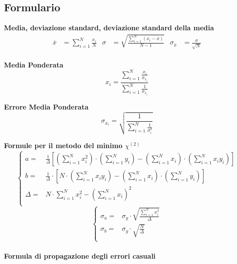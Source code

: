 \documentclass[a4paper,11pt,oneside]{article}
\begin{document}
\subsection{Formulario}
\textbf{Media, deviazione standard, deviazione standard della media}
\begin{align*}
        \overline{x}&=\sum\limits_{i=1}^{N} \frac{x_{i}}{N}&
        \sigma&=\sqrt{\frac{\sum\limits_{i=1}^{N} (x_{i}-\overline{x})}{N-1}}&
        \sigma_{\overline{x}}&=\frac{\sigma}{\sqrt{N}}
\end{align*}\\

\textbf{Media Ponderata}
\begin{equation*}
\label{eq:media_pond}
    x_i=\frac{\sum_{i=1}^{N}\frac{x_i}{\sigma_{x_i}}}{\sum_{i=1}^{N}\frac{1}{\sigma_{x_i}}}
\end{equation*}

\textbf{Errore Media Ponderata}
\begin{equation*}
\label{eq:errore_media_pond}
     \sigma_{x_i}=\sqrt{\frac{1}{\sum_{i=1}^{N}\frac{1}{\sigma_{i}^{2}}}}
\end{equation*}

\textbf{Formule per il metodo del minimo ${\chi}^{(2)}$}
\begin{equation*}
        \begin{cases}
    a=&\frac{1}{\Delta}[(\sum\limits_{i=1}^{N}{x_{i}^{2}})\cdot(\sum\limits_{i=1}^{N}{y_{i}})-(\sum\limits_{i=1}^{N}{x_{i}})\cdot(\sum\limits_{i=1}^{N}{x_{i}y_{i}})] \\ 
    b=&\frac{1}{\Delta }\cdot \left [N\cdot \left ( \sum\limits_{i=1}^{N}x_i y_i \right )-\left ( \sum\limits_{i=1}^{N}x_i \right )\cdot \left ( \sum\limits_{i=1}^{N}y_i \right )  \right ]\\
    \Delta=& N\cdot \sum\limits_{i=1}^{N} x_i^{2} - \left ( \sum\limits_{i=1}^{N}x_i \right )^{2}\\
    \end{cases}
\end{equation*}
\begin{equation*}
    \begin{cases}
    \sigma_{a}=&\sigma_{y}\cdot\sqrt{\frac{\sum_{i=1}^{N}{x_{i}^{2}}}{\Delta}} \\
    \sigma_{b}=&\sigma_y\cdot \sqrt{\frac{N}{\Delta }}\\
    \end{cases}
    \label{equation:err_chi_quadro}
\end{equation*}
\\
\textbf{Formula di propagazione degli errori casuali}\\
\end{document}
